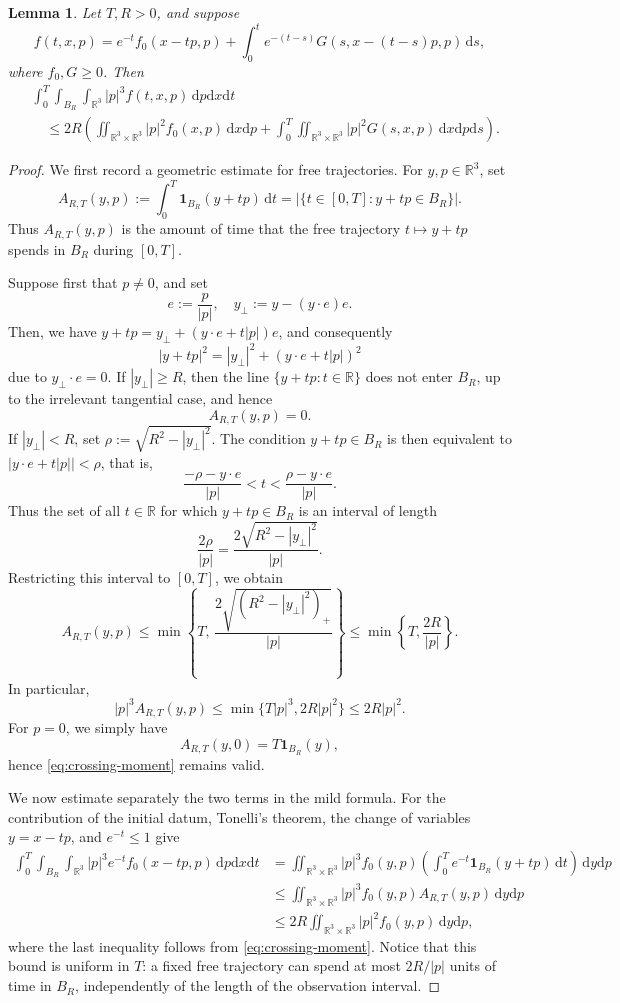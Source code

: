 \documentclass[10pt,reqno]{amsart}
\numberwithin{equation}{section}
\newtheorem{lemma}{Lemma}[section]
\theoremstyle{definition}
\newcommand{\R}{\mathbb R}
\newcommand{\dx}{\mathrm{d}x}
\newcommand{\dpp}{\mathrm{d}p}
\newcommand{\dt}{\mathrm{d}t}
\newcommand{\ds}{\mathrm{d}s}
\newcommand{\dy}{\mathrm{d}y}
\newcommand{\one}{\mathbf 1}
\newcommand{\bq}{\begin{equation}}
\newcommand{\eq}{\end{equation}}
\newcommand{\lt}{\left}
\newcommand{\rt}{\right}
\begin{document}
\begin{lemma}\label{lem:3-mom}
Let $T,R>0$, and suppose
\[
 f(t,x,p)  =e^{-t}f_0(x-tp,p) +\int_0^te^{-(t-s)}G(s,x-(t-s)p,p)\,\ds,
\]
where $f_0,G\geq0$.  Then
\begin{align*}
 &\int_0^T\int_{B_R}\int_{\R^3}|p|^3f(t,x,p)\,\dpp\dx\dt \\
 &\quad\leq 2R\lt(  \iint_{\R^3\times\R^3}|p|^2f_0(x,p)\,\dx\dpp  +\int_0^T\iint_{\R^3\times\R^3}|p|^2G(s,x,p)\,\dx\dpp\ds  \rt).
\end{align*}
\end{lemma}

\begin{proof}
We first record a geometric estimate for free trajectories. For $y,p\in\R^3$, set
\[
 A_{R,T}(y,p)  :=  \int_0^T \one_{B_R}(y+tp)\,\dt  =  \lt|\{t\in[0,T]:y+tp\in B_R\}\rt|.
\]
Thus $A_{R,T}(y,p)$ is the amount of time that the free trajectory $t\mapsto y+tp$ spends in $B_R$ during $[0,T]$.

Suppose first that $p\neq0$, and set
\[
 e:=\frac{p}{|p|},  \quad  y_\perp:=y-(y\cdot e)e.
\]
Then, we have $ y+tp  =  y_\perp+(y\cdot e+t|p|)e$, and consequently
\[
 |y+tp|^2  =  |y_\perp|^2+(y\cdot e+t|p|)^2
\]
due to $y_\perp\cdot e=0$. If $|y_\perp|\geq R$, then the line $\{y+tp:t\in\R\}$ does not enter $B_R$, up to the irrelevant tangential case, and hence
\[
 A_{R,T}(y,p)=0.
\]
If $|y_\perp|<R$, set $\rho:=\sqrt{R^2-|y_\perp|^2}$. The condition $y+tp\in B_R$ is then equivalent to $ |y\cdot e+t|p||<\rho$, that is,
\[
 \frac{-\rho-y\cdot e}{|p|}  <  t  <  \frac{\rho-y\cdot e}{|p|}.
\]
Thus the set of all $t\in\R$ for which $y+tp\in B_R$ is an interval of length
\[
 \frac{2\rho}{|p|}  =  \frac{2\sqrt{R^2-|y_\perp|^2}}{|p|}.
\]
Restricting this interval to $[0,T]$, we obtain
\bq \label{eq:crossing-time}
 A_{R,T}(y,p)  \leq  \min\lt\{  T,\,  \frac{2\sqrt{(R^2-|y_\perp|^2)_+}}{|p|}  \rt\}  \leq  \min\lt\{T,\frac{2R}{|p|}\rt\}.
\eq
In particular,
\bq \label{eq:crossing-moment}
 |p|^3A_{R,T}(y,p)  \leq  \min\{T|p|^3,2R|p|^2\}  \leq  2R|p|^2.
\eq
For $p=0$, we simply have
\[
 A_{R,T}(y,0)=T\one_{B_R}(y),
\]
hence \eqref{eq:crossing-moment} remains valid.

We now estimate separately the two terms in the mild formula. For the contribution of the initial datum, Tonelli's theorem, the change of variables $y=x-tp$, and $e^{-t}\leq1$ give
\begin{align*}
 \int_0^T\int_{B_R}\int_{\R^3}  |p|^3e^{-t}f_0(x-tp,p)\,\dpp\dx\dt  &=  \iint_{\R^3\times\R^3}  |p|^3f_0(y,p)  \lt(  \int_0^T e^{-t}\one_{B_R}(y+tp)\,\dt  \rt)  \,\dy\dpp  \\
 & \leq  \iint_{\R^3\times\R^3}  |p|^3f_0(y,p)A_{R,T}(y,p)\,\dy\dpp  \\
 & \leq  2R  \iint_{\R^3\times\R^3}  |p|^2f_0(y,p)\,\dy\dpp,
\end{align*}
where the last inequality follows from \eqref{eq:crossing-moment}.  Notice that this bound is uniform in $T$: a fixed free trajectory can spend at most $2R/|p|$ units of time in $B_R$, independently of the length of the observation interval.


\end{proof}
\end{document}

